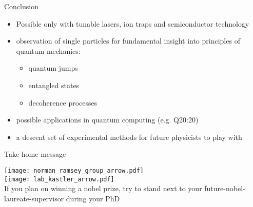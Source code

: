 \begin{frame}[t]{Conclusion}
  \begin{itemize}
    \item Possible only with tunable lasers, ion traps and semiconductor
      technology
    \item observation of single particles for fundamental insight into
      principles of quantum mechanics:
      \begin{itemize}
        \item quantum jumps
        \item entangled states
        \item decoherence processes
      \end{itemize}
    \item possible applications in quantum computing (e.g. Q20:20)
    \item a descent set of experimental methods for future physicists to play
      with
  \end{itemize}
\end{frame}

\begin{frame}[t]{Take home message}
  \begin{center}
    \texttt{[image: norman\_ramsey\_group\_arrow.pdf]}\\
    \texttt{[image: lab\_kastler\_arrow.pdf]}\\
    \vspace{0.1cm}
    If you plan on winning a nobel prize, try to stand next to your
    future-nobel-laureate-supervisor during your PhD
  \end{center}

\end{frame}
